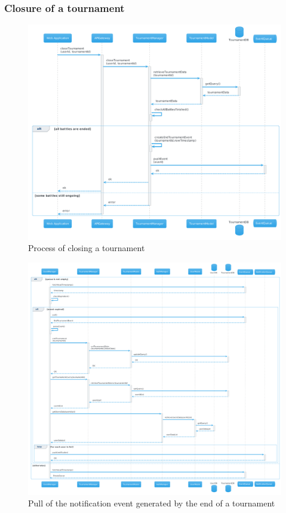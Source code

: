 \subsubsection{Closure of a tournament}
\begin{figure}[H]
    \hspace{-1.7cm}
    \includegraphics[width=1.2\textwidth]{Diagrams/sequence/close_tournament.png}
    \caption{Process of closing a tournament}
\end{figure}
\begin{figure}[H]
    \hspace{-1.5cm}
    \includegraphics[width=1.2\textwidth]{Diagrams/sequence/close_tournament_pull.png}
    \caption{Pull of the notification event generated by the end of a tournament}
\end{figure}

